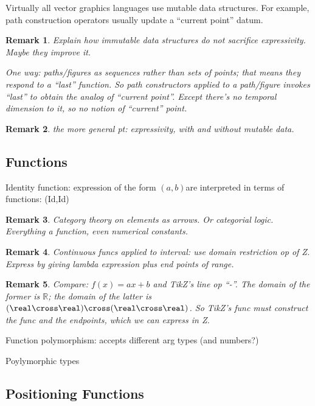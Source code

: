 \documentclass[reqno,12pt]{tufte-handout}
\numberwithin{equation}{subsection}
\numberwithin{equation}{subsection}
\newtheorem{remark}{Remark}
\newcommand\ab{\((a,b)\)}
\newcommand\R{\(\mathds{R}\)}
\begin{document}
Virtually all vector graphics languages use mutable data structures.
For example, path construction operators usually update a ``current
point'' datum.

\begin{remark}
  Explain how immutable data structures do not sacrifice expressivity.
  Maybe they improve it.

  One way: paths/figures as sequences rather than sets of points; that
  means they respond to a ``last'' function.  So path constructors
  applied to a path/figure invokes ``last'' to obtain the analog of
  ``current point''.  Except there's no temporal dimension to it, so
  no notion of ``current'' point.
\end{remark}

\begin{remark}
  the more general pt:  expressivity, with and without mutable data.
\end{remark}

\subsection{Functions}
\label{subs:functions}

Identity function: expression of the form \ab are interpreted in terms
of functions: (Id,Id)

\begin{remark}
  Category theory on elements as arrows.  Or categorial logic.
  Everything a function, even numerical constants.
\end{remark}

\begin{remark}
  Continuous funcs applied to interval: use domain restriction op of
  Z.  Express by giving lambda expression plus end points of range.
\end{remark}

\begin{remark}
  Compare: \(f(x) = ax + b\) and TikZ's line op ``-\-''.  The domain
  of the former is \R{}; the domain of the latter is
  \((\real\cross\real)\cross(\real\cross\real)\).  So TikZ's func must
  construct the func and the endpoints, which we can express in Z.
\end{remark}

Function polymorphism: accepts different arg types (and numbers?)

Poylymorphic types

\subsection{Positioning Functions}
\label{subs:positioning}
\end{document}
